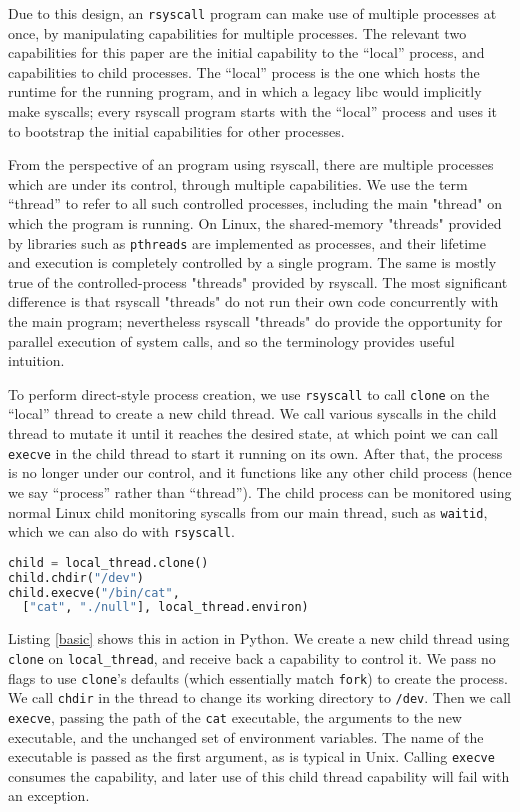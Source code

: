 \documentclass{acmart}
\begin{document}
Due to this design, an \texttt{rsyscall} program can make use of multiple processes at once,
by manipulating capabilities for multiple processes.
The relevant two capabilities for this paper are the initial capability to the ``local'' process,
and capabilities to child processes.
The ``local'' process is the one which hosts the runtime for the running program,
and in which a legacy libc would implicitly make syscalls;
every rsyscall program starts with the ``local'' process
and uses it to bootstrap the initial capabilities for other processes.

From the perspective of an program using rsyscall,
there are multiple processes which are under its control,
through multiple capabilities.
We use the term ``thread'' to refer to all such controlled processes,
including the main "thread" on which the program is running.
On Linux, the shared-memory "threads" provided by libraries such as \texttt{pthreads}
are implemented as processes,
and their lifetime and execution is completely controlled by a single program.
The same is mostly true of the controlled-process "threads" provided by rsyscall.
The most significant difference is that rsyscall "threads"
do not run their own code concurrently with the main program;
nevertheless rsyscall "threads" do provide the opportunity for parallel execution of system calls,
and so the terminology provides useful intuition.

To perform direct-style process creation,
we use \texttt{rsyscall} to call \texttt{clone} on the ``local'' thread to create a new child thread.
We call various syscalls in the child thread to mutate it until it reaches the desired state,
at which point we can call \texttt{execve} in the child thread to start it running on its own.
After that, the process is no longer under our control, and it functions like any other child process
(hence we say ``process'' rather than ``thread'').
The child process can be monitored using normal Linux child monitoring syscalls from our main thread,
such as \texttt{waitid},
which we can also do with \texttt{rsyscall}.

\begin{lstlisting}[float,language=Python,label={basic},caption={Creating a new process, changing CWD, and execing}]
child = local_thread.clone()
child.chdir("/dev")
child.execve("/bin/cat",
  ["cat", "./null"], local_thread.environ)
\end{lstlisting}
Listing \ref{basic} shows this in action in Python.
We create a new child thread using \texttt{clone} on \verb|local_thread|,
and receive back a capability to control it.
We pass no flags to use \texttt{clone}'s defaults
(which essentially match \texttt{fork}) to create the process.
We call \texttt{chdir} in the thread to change its working directory to \texttt{/dev}.
Then we call \texttt{execve},
passing the path of the \texttt{cat} executable,
the arguments to the new executable,
and the unchanged set of environment variables.
The name of the executable is passed as the first argument,
as is typical in Unix.
Calling \texttt{execve} consumes the capability,
and later use of this child thread capability will fail with an exception.
\end{document}
